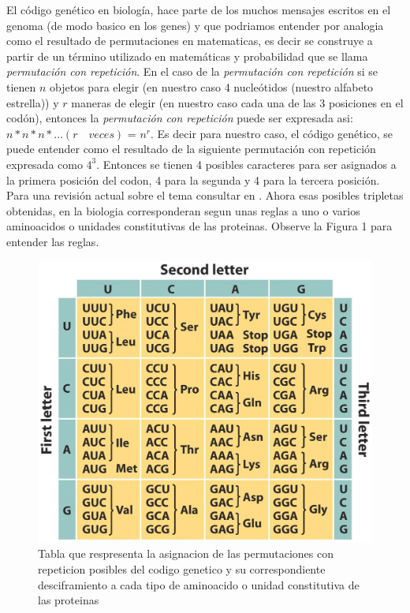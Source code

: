 \documentclass[10pt]{article}
\begin{document}
El código genético en biología, hace parte de los muchos mensajes escritos en
el genoma (de modo basico en los genes) y que podriamos entender por analogia como el resultado de
permutaciones en matematicas, es decir se construye a partir de un término utilizado en matemáticas y probabilidad que se llama \textit{permutación con repetición}. En el caso de la  \textit{permutación con repetición} si se tienen $n$ objetos para elegir (en nuestro caso 4 nucleótidos (nuestro alfabeto estrella)) y $r$ 
maneras de elegir (en nuestro caso cada una de las 3 posiciones en el codón),
entonces la \textit{permutación con repetición} puede ser expresada asi:  $n *
n * n * \ldots (r \quad veces)$ = $n^r$. Es decir para nuestro caso, el código
genético, se puede entender como  el resultado de la siguiente permutación con
repetición expresada como $4^3$. Entonces se tienen  4 posibles caracteres
para ser asignados a la primera posición del codon, 4 para la segunda y 4 para
la tercera posición. Para una revisión actual sobre el tema consultar en
\cite{giulio2016}. Ahora esas posibles tripletas obtenidas, en la biologia
corresponderan segun unas reglas a uno o varios aminoacidos o unidades
constitutivas de las proteinas. Observe la Figura 1 para entender las reglas.
\begin{figure}[htb!]
\includegraphics[scale=0.3]{./figures/code.jpg}
\caption{Tabla que respresenta la asignacion de las permutaciones con
repeticion posibles del codigo genetico y su correspondiente desciframiento a
cada tipo de aminoacido o unidad constitutiva de las proteinas}
\end{figure}
\end{document}
